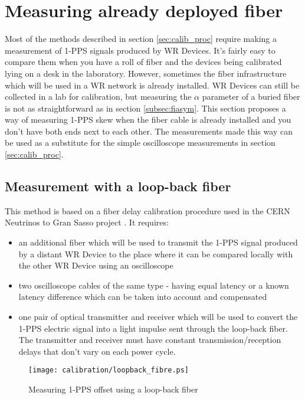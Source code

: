 \section{Measuring already deployed fiber}

Most of the methods described in section \ref{sec:calib_proc} require making a
measurement of 1-PPS signals produced by WR Devices. It's fairly easy to compare
them when you have a roll of fiber and the devices being calibrated lying on a
desk in the laboratory. However, sometimes the fiber infrastructure which
will be used in a WR network is already installed. WR Devices can still be
collected in a lab for calibration, but measuring the $\alpha$ parameter of a
buried fiber is not as straightforward as in section \ref{subsec:fiasym}. This
section proposes a way of measuring 1-PPS skew when the fiber cable is
already installed and you don't have both ends next to each other. The
measurements made this way can be used as a substitute for the simple
oscilloscope measurements in section \ref{sec:calib_proc}.

\subsection{Measurement with a loop-back fiber}
\label{subsec:loopback}
This method is based on a fiber delay calibration procedure used in the CERN
Neutrinos to Gran Sasso project \cite{cngs}. It requires:
\begin{itemize}
	\item an additional fiber which will be used to transmit the 1-PPS signal
		produced by a distant WR Device to the place where it can be compared
		locally with the other WR Device using an oscilloscope
	\item two oscilloscope cables of the same type - having equal latency or a
    known latency difference which can be taken into account and compensated
	\item one pair of optical transmitter and receiver which will be used to
		convert the 1-PPS electric signal into a light impulse sent through the
		loop-back fiber. The transmitter and receiver must have constant
		transmission/reception delays that don't vary on each power cycle.
\end{itemize}

\begin{figure}[ht]
	\begin{center}
	\texttt{[image: calibration/loopback\_fibre.ps]}
	\caption{Measuring 1-PPS offset using a loop-back fiber}
	\label{fig:loopback}
	\end{center}
\end{figure}


